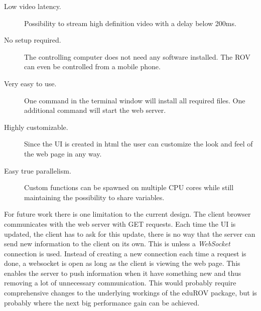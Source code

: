 \begin{description}
\item[Low video latency.] Possibility to stream high definition video with a delay below 200ms.

\item[No setup required.] The controlling computer does not need any software installed. The ROV can even be controlled from a mobile phone.

\item[Very easy to use.] One command in the terminal window will install all required files. One additional command will start the web server.

\item[Highly customizable.] Since the UI is created in html the user can customize the look and feel of the web page in any way.

\item[Easy true parallelism.] Custom functions can be spawned on multiple CPU cores while still maintaining the possibility to share variables.
\end{description}

For future work there is one limitation to the current design. The client browser communicates with the web server with GET requests. Each time the UI is updated, the client has to ask for this update, there is no way that the server can send new information to the client on its own. This is unless a \emph{WebSocket} connection is used. Instead of creating a new connection each time a request is done, a websocket is open as long as the client is viewing the web page. This enables the server to push information when it have something new and thus removing a lot of unnecessary communication. This would probably require comprehensive changes to the underlying workings of the eduROV package, but is probably where the next big performance gain can be achieved.
